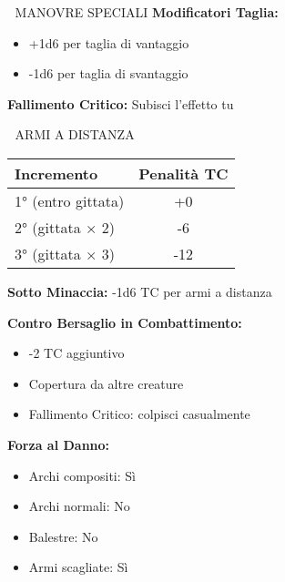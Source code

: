 \documentclass[10pt,a4paper,landscape]{article}
\begin{document}
\begin{multicols}{4}
\begin{mainsection}{🤺 MANOVRE SPECIALI}
			\textbf{Modificatori Taglia:}
			\begin{itemize}[noitemsep,leftmargin=8pt]
				\item +1d6 per taglia di vantaggio
				\item -1d6 per taglia di svantaggio
			\end{itemize}

			\textbf{Fallimento Critico:} Subisci l'effetto tu
		\end{mainsection}

		\begin{mainsection}{🏹 ARMI A DISTANZA}
			\begin{tabular}{@{}lc@{}}
				\toprule
				\textbf{Incremento} & \textbf{Penalità TC} \\
				\midrule
				1° (entro gittata) & +0 \\
				2° (gittata × 2) & -6 \\
				3° (gittata × 3) & -12 \\
				\bottomrule
			\end{tabular}
			\medskip
			\textbf{Sotto Minaccia:} -1d6 TC per armi a distanza

			\textbf{Contro Bersaglio in Combattimento:}
			\begin{itemize}[noitemsep,leftmargin=8pt]
				\item -2 TC aggiuntivo
				\item Copertura da altre creature
				\item Fallimento Critico: colpisci casualmente
			\end{itemize}

			\textbf{Forza al Danno:}
			\begin{itemize}[noitemsep,leftmargin=8pt]
				\item Archi compositi: Sì
				\item Archi normali: No
				\item Balestre: No
				\item Armi scagliate: Sì
			\end{itemize}
		\end{mainsection}

		\columnbreak


\end{multicols}
\end{document}
